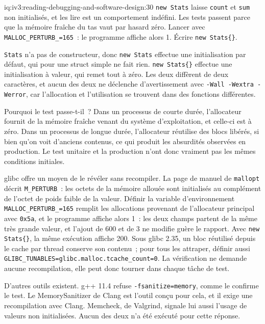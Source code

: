 \begin{solution}{iq:iv3:reading-debugging-and-software-design:30}
\texttt{new Stats} laisse \texttt{count} et \texttt{sum} non initialisés, et les lire est un comportement indéfini. Les tests passent parce que la mémoire fraîche du tas vaut par hasard zéro. Lancer avec \texttt{MALLOC\_PERTURB\_=165}~: le programme affiche alors 1. Écrire \texttt{new Stats\{\}}.

\texttt{Stats} n'a pas de constructeur, donc \texttt{new Stats} effectue une initialisation par défaut, qui pour une struct simple ne fait rien. \texttt{new Stats\{\}} effectue une initialisation à valeur, qui remet tout à zéro. Les deux diffèrent de deux caractères, et aucun des deux ne déclenche d'avertissement avec \texttt{-Wall -Wextra -Werror}, car l'allocation et l'utilisation se trouvent dans des fonctions différentes.

Pourquoi le test passe-t-il~? Dans un processus de courte durée, l'allocateur fournit de la mémoire fraîche venant du système d'exploitation, et celle-ci est à zéro. Dans un processus de longue durée, l'allocateur réutilise des blocs libérés, si bien qu'on voit d'anciens contenus, ce qui produit les absurdités observées en production. Le test unitaire et la production n'ont donc vraiment pas les mêmes conditions initiales.

glibc offre un moyen de le révéler sans recompiler. La page de manuel de \texttt{mallopt} décrit \texttt{M\_PERTURB}~: les octets de la mémoire allouée sont initialisés au complément de l'octet de poids faible de la valeur. Définir la variable d'environnement \texttt{MALLOC\_PERTURB\_=165} remplit les allocations provenant de l'allocateur principal avec \texttt{0x5a}, et le programme affiche alors 1~: les deux champs partent de la même très grande valeur, et l'ajout de 600 et de 3 ne modifie guère le rapport. Avec \texttt{new Stats\{\}}, la même exécution affiche 200. Sous glibc 2.35, un bloc réutilisé depuis le cache par thread conserve son contenu~; pour tous les attraper, définir aussi \texttt{GLIBC\_TUNABLES=glibc.malloc.tcache\_count=0}. La vérification ne demande aucune recompilation, elle peut donc tourner dans chaque tâche de test.

D'autres outils existent. g++ 11.4 refuse \texttt{-fsanitize=memory}, comme le confirme le test. Le MemorySanitizer de Clang est l'outil conçu pour cela, et il exige une recompilation avec Clang. Memcheck, de Valgrind, signale lui aussi l'usage de valeurs non initialisées. Aucun des deux n'a été exécuté pour cette réponse.


\end{solution}

